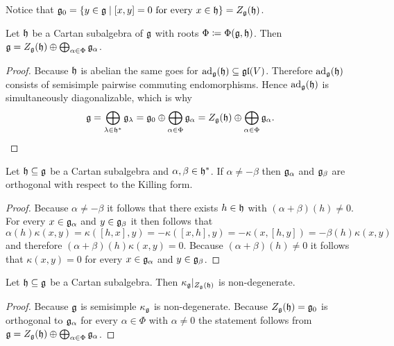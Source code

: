 \begin{rem}
 Notice that $\mathfrak{g}_0 = \{y \in \mathfrak{g} \mid \text{$[x,y] = 0$ for every $x \in \mathfrak{h}$}\} = Z_{\mathfrak{g}}(\mathfrak{h})$.
\end{rem}



\begin{lem}
 Let $\mathfrak{h}$ be a Cartan subalgebra of $\mathfrak{g}$ with roots $\Phi \coloneqq \Phi(\mathfrak{g}, \mathfrak{h})$. Then $\mathfrak{g} = Z_{\mathfrak{g}}(\mathfrak{h}) \oplus \bigoplus_{\alpha \in \Phi} \mathfrak{g}_\alpha$.
\end{lem}
\begin{proof}
 Because $\mathfrak{h}$ is abelian the same goes for $\operatorname{ad}_{\mathfrak{g}}(\mathfrak{h}) \subseteq \mathfrak{gl}(V)$. Therefore $\operatorname{ad}_{\mathfrak{g}}(\mathfrak{h})$ consists of semisimple pairwise commuting endomorphisms. Hence $\operatorname{ad}_{\mathfrak{g}}(\mathfrak{h})$ is simultaneously diagonalizable, which is why
 \[
  \mathfrak{g}
  = \bigoplus_{\lambda \in \mathfrak{h}^*} \mathfrak{g}_\lambda
  = \mathfrak{g}_0 \oplus \bigoplus_{\alpha \in \Phi} \mathfrak{g}_\alpha
  = Z_{\mathfrak{g}}(\mathfrak{h}) \oplus \bigoplus_{\alpha \in \Phi} \mathfrak{g}_\alpha.
  \qedhere
 \]
\end{proof}




\begin{lem}
Let $\mathfrak{h} \subseteq \mathfrak{g}$ be a Cartan subalgebra and $\alpha, \beta \in \mathfrak{h}^*$. If $\alpha \neq -\beta$ then $\mathfrak{g}_\alpha$ and $\mathfrak{g}_\beta$ are orthogonal with respect to the Killing form.
\end{lem}
\begin{proof}
 Because $\alpha \neq -\beta$ it follows that there exists $h \in \mathfrak{h}$ with $(\alpha+\beta)(h) \neq 0$. For every $x \in \mathfrak{g}_\alpha$ and $y \in \mathfrak{g}_\beta$ it then follows that
 \[
  \alpha(h) \kappa(x,y)
  = \kappa([h,x],y)
  = -\kappa([x,h],y)
  = -\kappa(x,[h,y])
  = -\beta(h)\kappa(x,y)
 \]
 and therefore $(\alpha+\beta)(h)\kappa(x,y) = 0$. Because $(\alpha+\beta)(h) \neq 0$ it follows that $\kappa(x,y) = 0$ for every $x \in \mathfrak{g}_\alpha$ and $y \in \mathfrak{g}_\beta$.
\end{proof}


\begin{cor}
 Let $\mathfrak{h} \subseteq \mathfrak{g}$ be a Cartan subalgebra. Then $\kappa_{\mathfrak{g}}|_{Z_{\mathfrak{g}}(\mathfrak{h})}$ is non-degenerate.
\end{cor}
\begin{proof}
 Because $\mathfrak{g}$ is semisimple $\kappa_{\mathfrak{g}}$ is non-degenerate. Because $Z_{\mathfrak{g}}(\mathfrak{h}) = \mathfrak{g}_0$ is orthogonal to $\mathfrak{g}_\alpha$ for every $\alpha \in \Phi$ with $\alpha \neq 0$ the statement follows from $\mathfrak{g} = Z_{\mathfrak{g}}(\mathfrak{h}) \oplus \bigoplus_{\alpha \in \Phi} \mathfrak{g}_\alpha$.
\end{proof}






